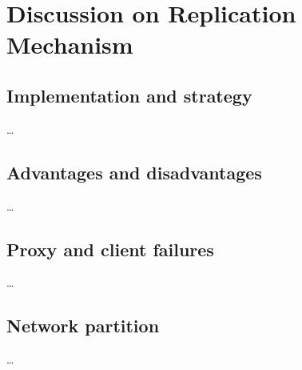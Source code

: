 
\section{Discussion on Replication Mechanism}

\subsection{Implementation and strategy}
\dots

\subsection{Advantages and disadvantages}
\dots

\subsection{Proxy and client failures}
\dots

\subsection{Network partition}
\dots
